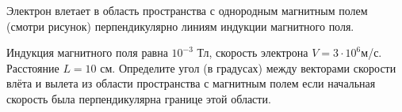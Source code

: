 
Электрон влетает в область пространства с однородным магнитным полем (смотри рисунок) перпендикулярно линиям индукции магнитного поля.


Индукция магнитного поля равна $ 10^{-3} $ Тл, скорость электрона $ V=3\cdot10^6 $м/с. 
Расстояние $ L =10 $ см. Определите угол (в градусах) между векторами скорости влёта и вылета из 
области пространства с магнитным полем если начальная скорость была перпендикулярна границе этой области.


